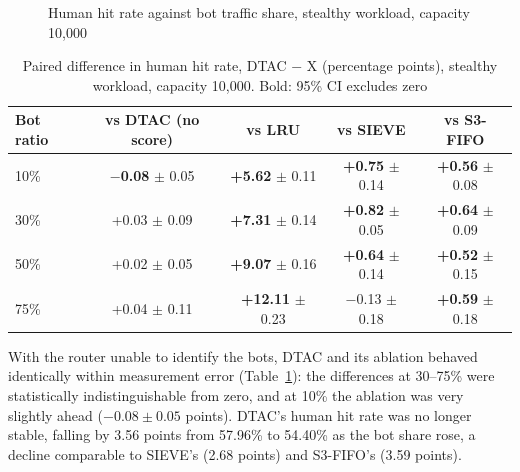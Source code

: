 \begin{figure}[htbp]
    \centering
    \caption{Human hit rate against bot traffic share, stealthy workload, capacity 10{,}000}
    \label{fig:hhr-stealthy}
\end{figure}

\begin{table}[htbp]
    \centering
    \caption{Paired difference in human hit rate, DTAC $-$ X (percentage points), stealthy workload, capacity 10{,}000. Bold: 95\% CI excludes zero}
    \label{tab:paired-stealthy}
    \small
    \begin{tabular}{lcccc}
        \toprule
        Bot ratio & vs DTAC (no score) & vs LRU & vs SIEVE & vs S3-FIFO \\
        \midrule
        10\% & \textbf{$-$0.08} $\pm$ 0.05 & \textbf{+5.62} $\pm$ 0.11 & \textbf{+0.75} $\pm$ 0.14 & \textbf{+0.56} $\pm$ 0.08 \\
        30\% & +0.03 $\pm$ 0.09 & \textbf{+7.31} $\pm$ 0.14 & \textbf{+0.82} $\pm$ 0.05 & \textbf{+0.64} $\pm$ 0.09 \\
        50\% & +0.02 $\pm$ 0.05 & \textbf{+9.07} $\pm$ 0.16 & \textbf{+0.64} $\pm$ 0.14 & \textbf{+0.52} $\pm$ 0.15 \\
        75\% & +0.04 $\pm$ 0.11 & \textbf{+12.11} $\pm$ 0.23 & $-$0.13 $\pm$ 0.18 & \textbf{+0.59} $\pm$ 0.18 \\
        \bottomrule
    \end{tabular}
\end{table}

With the router unable to identify the bots, DTAC and its ablation behaved identically within measurement error (Table~\ref{tab:paired-stealthy}): the differences at 30--75\% were statistically indistinguishable from zero, and at 10\% the ablation was very slightly ahead ($-0.08 \pm 0.05$ points). DTAC's human hit rate was no longer stable, falling by 3.56 points from 57.96\% to 54.40\% as the bot share rose, a decline comparable to SIEVE's (2.68 points) and S3-FIFO's (3.59 points).


